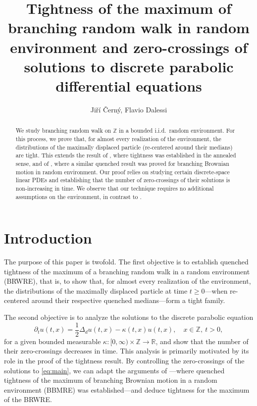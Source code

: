 \documentclass[12pt,reqno,oneside]{amsart}
\numberwithin{equation}{section}
\theoremstyle{definition}
\theoremstyle{remark}
\newcommand{\R}{\mathbb{R}}
\newcommand{\Z}{\mathbb{Z}}
\begin{document}
\title[Tightness of the maximum of BRWRE and zero-crossings]
{Tightness of the maximum of branching random walk in random environment
  and zero-crossings of solutions to discrete parabolic differential equations}

\author{Jiří Černý, Flavio Dalessi}

\begin{abstract}
    We study branching random walk on $\mathbb Z$ in a bounded i.i.d.~random
    environment. For this process, we prove that, for almost every realization
    of the environment, the distributions of the maximally displaced particle
    (re-centered around their medians) are tight. This extends the result of
    \cite{Kri24}, where tightness was established in the annealed sense, and
    of \cite{CDO25}, where a similar quenched result was proved for branching
    Brownian motion in random environment. Our proof relies on studying
    certain discrete-space linear PDEs and establishing that the number of
    zero-crossings of their solutions is non-increasing in time. We observe
    that our technique requires no additional assumptions on the environment,
    in contrast to \cite{Kri24,CDO25}.
\end{abstract}

\maketitle


\section{Introduction}
\label{sec:introduction}

The purpose of this paper is twofold. The first objective is to establish
quenched tightness of the maximum of a branching random walk in a random
environment (BRWRE), that is, to show that, for almost every realization of
the environment, the distributions of the maximally displaced particle at
time $t\geq 0$---when re-centered around their respective quenched
medians---form a tight family.

The second objective is to analyze the solutions to the
discrete parabolic equation
\begin{equation}
  \label{eq:main}
  \partial_tu(t,x)
  = \frac{1}{2} \Delta_d u(t,x) - \kappa(t,x)u(t,x), \quad x \in \Z, \ t >0,
\end{equation}
for a given bounded measurable $\kappa : [0,\infty) \times \Z \rightarrow \R$,
and show that the number of their zero-crossings decreases in time.
This analysis is primarily motivated by its role in the proof of the
tightness result. By controlling the zero-crossings of the solutions to
\eqref{eq:main}, we can adapt the arguments of \cite{CDO25}---where quenched
tightness of the maximum of branching Brownian motion in a random
environment (BBMRE) was established---and deduce tightness for the maximum of
the BRWRE.
\end{document}
